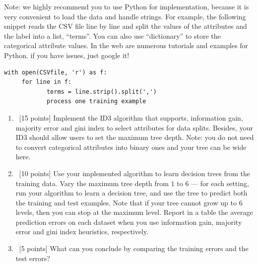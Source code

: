 \documentclass[12pt, fullpage,letterpaper]{article}
\begin{document}
\begin{enumerate}
\noindent Note: we highly recommend you to use Python for implementation, because it is very convenient to load the data and handle strings. For example, the following snippet reads the CSV file line by line and split the values of the attributes and the label into a list, ``terms''. You can also use ``dictionary'' to store the categorical attribute values. In the web are numerous tutorials and examples for Python. if you have issues, just google it!
\begin{lstlisting}
with open(CSVfile, 'r') as f:
     for line in f:
            terms = line.strip().split(',')
            process one training example
\end{lstlisting}
\begin{enumerate}
\item~[15 points] Implement the ID3 algorithm that supports, information gain,  majority error and gini index to select attributes for data splits. Besides, your ID3 should allow users to set the maximum tree depth. Note: you do not need to convert categorical attributes into binary ones and your tree can be wide here. 
\item~[10 points] Use your implemented algorithm to learn decision trees from the training data. Vary the maximum  tree depth from $1$ to $6$  --- for each setting, run your algorithm to learn a decision tree, and use the tree to  predict both the training  and test examples. Note that if your tree cannot grow up to 6 levels, then you can stop at the maximum level. Report in a table the average prediction errors on each dataset when you use information gain, majority error and gini index heuristics, respectively.

\item~[5 points] What can you conclude by comparing the training errors and the test errors? 
\end{enumerate}



\end{enumerate}
\end{document}

